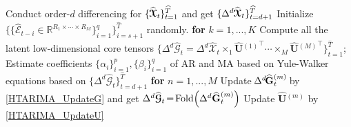 \documentclass[letterpaper]{article} %
\numberwithin{theorem}{section}
\newcommand{\ten}[1]{ \boldsymbol{\mathcal #1}}
\newcommand{\bbR}[1]{\mathbb{R}^{#1}}
\begin{document}
\begin{algorithm}[ttt!]
\begin{algorithmic}[1]
		\STATE Conduct order-$d$ differencing  for  $\hspace{-0.01cm} \{\hspace{-0.01cm}{\widehat{\ten{X}}_t}\hspace{-0.01cm}\}_{t=1}^{\widehat{T}}\hspace{-0.01cm}$ and get  $ \{\hspace{-0.01cm}\Delta^d\hspace{-0.01cm} {\widehat{\ten{X}}_t}\}_{t=d+1}^{\widehat{T}}\hspace{-0.01cm}$  
		\STATE Initialize  $\{\{\widehat{\ten{E}}_{{t-i}} \in \bbR{R_1 \times \cdots \times R_M} \}_{i=1}^q\}_{i=s+1}^{\widehat{T}}$ randomly.
		\STATE\textbf{for}  {$k = 1, ...,K$}
		\STATE \quad Compute all the latent low-dimensional core tensors  \quad  $ \{ \Delta^d {\widehat{\ten{G}}_t}    = \Delta^d {\widehat{\ten{X}}_t}  \times_1  \widehat{\mathbf U}{^{(1)}}^\top   \cdots \times_M  \widehat{\mathbf U}{^{(M)}}^\top\}_{t=1}^{\widehat{T}}$;
		\STATE  \quad  Estimate coefficients  $ \{\alpha_i \}_{i=1}^p,  \{\beta_i \}_{i=1}^q $  of  AR and MA  \hspace{0.5cm} based on Yule-Walker equations based on $ \{\Delta^d {\widehat{\ten{G}}_t}\}_{t=d+1}^{\widehat{T}}$
		\STATE \quad \textbf{for} $n = 1, ...,M$
		\STATE	\quad \quad   Update $ \hspace{-0.05cm} \Delta^d\hspace{-0.05cm}  {\widehat{\mathbf{G}}^{(m)}_{t}}\hspace{-0.05cm}$  by \eqref{HTARIMA_UpdateG} and get $\Delta^d {\widehat{\ten{G}}_{t}} \hspace{-0.05cm}=\hspace{-0.05cm}  \text{Fold} \Big
		(\Delta^d{\widehat{\mathbf{G}}^{(m)}_{t}}\Big)  $ 							
		\STATE	\quad \quad   Update $\widehat{ \mathbf U}{^{(m)}}$ by \eqref{HTARIMA_UpdateU}
		

\end{algorithmic}
\end{algorithm}
\end{document}
